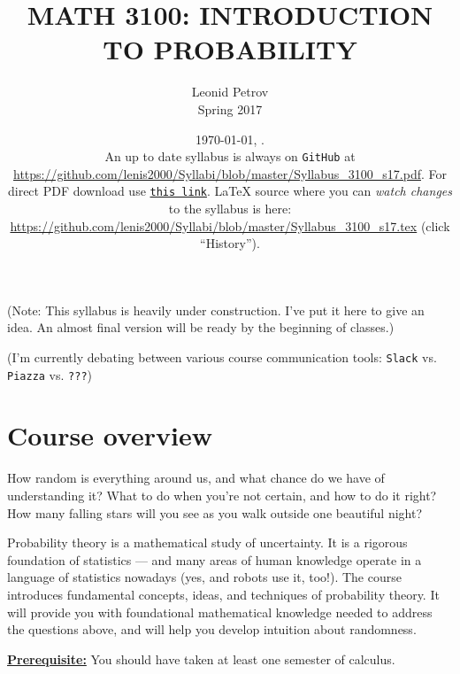 \documentclass[oneside,11pt]{amsart}
\newcommand{\razdel}[1]{\smallskip\underline{\textbf{#1:}}\smallskip}
\newcommand{\note}[1]{{\Large\sf{}\color{blue}(#1)}}
\begin{document}
\title[MATH 3100: INTRODUCTION TO PROBABILITY]{MATH 3100: INTRODUCTION TO PROBABILITY}
\author{Leonid Petrov\\Spring 2017}
\date{\today, \currenttime.\\An up to date syllabus is always on \texttt{GitHub} at \url{https://github.com/lenis2000/Syllabi/blob/master/Syllabus_3100_s17.pdf}. For direct PDF download use \href{https://github.com/lenis2000/Syllabi/raw/master/Syllabus_3100_s17.pdf}{\texttt{this link}}.
\LaTeX{} source where you can \textit{watch changes} to the syllabus is here: \url{https://github.com/lenis2000/Syllabi/blob/master/Syllabus_3100_s17.tex}
(click ``History'').}
\maketitle

\note{Note: This syllabus is heavily under construction. I've put it here to give an idea. An almost final version will be ready by the 
beginning of classes.}

\bigskip

\note{I'm currently debating between various course communication tools: \texttt{Slack} vs. \texttt{Piazza} vs. \texttt{???}}

\section{Course overview}

How random is everything around us, and what chance do we have of understanding it? 
What to do when you're not certain, and how to do it right?
How many falling stars will you see as you walk outside one beautiful night? 

Probability theory is a mathematical study of uncertainty.
It is a rigorous foundation of statistics --- and
many areas of human knowledge operate in a language of statistics nowadays
(yes, and robots use it, too!).
The course introduces fundamental concepts, ideas, and techniques of probability theory.
It  will provide you with foundational mathematical knowledge
needed to address the questions above, and 
will help you develop
intuition about randomness.

\razdel{Prerequisite} You should have taken at least one semester of calculus.
\end{document}
